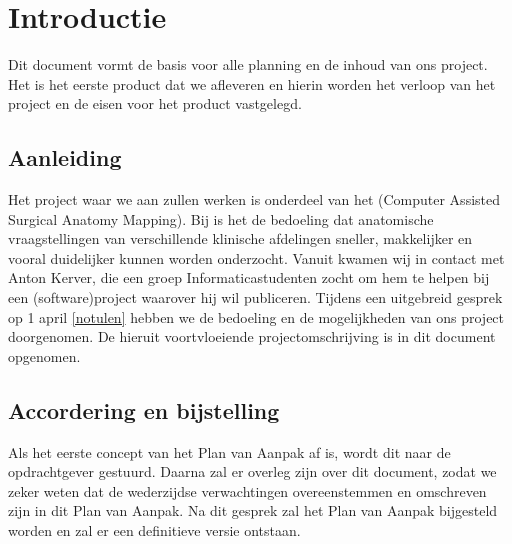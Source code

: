 \section{Introductie}


Dit document vormt de basis voor alle planning en de inhoud van ons project.
Het is het eerste product dat we afleveren en hierin worden het verloop van het project en de eisen voor het product vastgelegd.

\subsection{Aanleiding}


Het project waar we aan zullen werken is onderdeel van het \casamproject (Computer Assisted Surgical Anatomy Mapping). 
Bij \casam is het de bedoeling dat anatomische vraagstellingen van verschillende klinische afdelingen sneller, makkelijker en vooral duidelijker kunnen worden onderzocht.
Vanuit \casam kwamen wij in contact met Anton Kerver, die een groep Informaticastudenten zocht om hem te helpen bij een (software)project waarover hij wil publiceren.
Tijdens een uitgebreid gesprek op 1 april \ref{notulen} hebben we de bedoeling en de mogelijkheden van ons project doorgenomen.
De hieruit voortvloeiende projectomschrijving is in dit document opgenomen.

\subsection{Accordering en bijstelling}


Als het eerste concept van het Plan van Aanpak af is, wordt dit naar de opdrachtgever gestuurd.
Daarna zal er overleg zijn over dit document, zodat we zeker weten dat de wederzijdse verwachtingen overeenstemmen en omschreven zijn in dit Plan van Aanpak.
Na dit gesprek zal het Plan van Aanpak bijgesteld worden en zal er een definitieve versie ontstaan.

